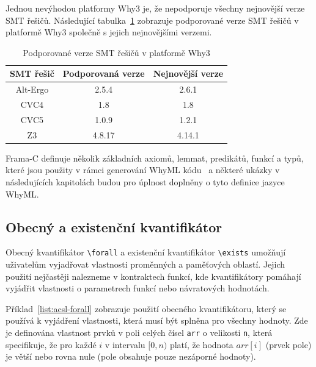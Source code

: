 Jednou nevýhodou platformy Why3 je,
že nepodporuje všechny nejnovější verze SMT řešičů.
Následující tabulka~\ref{tab:why3-smt-verze}
zobrazuje podporované verze SMT řešičů v platformě Why3 společně s jejich nejnovějšími verzemi.

\begin{table}[H]
    \centering
    \begin{tabular}{|c|c|c|}
        \hline
        SMT řešič & Podporovaná verze & Nejnovější verze \\
        \hline
        Alt-Ergo  & 2.5.4             & 2.6.1            \\
        CVC4      & 1.8               & 1.8              \\
        CVC5      & 1.0.9             & 1.2.1            \\
        Z3        & 4.8.17            & 4.14.1           \\
        \hline
    \end{tabular}
    \caption{Podporované verze SMT řešičů v platformě Why3}
    \label{tab:why3-smt-verze}
\end{table}


Frama\mbox{-}C definuje několik základních axiomů, lemmat, predikátů, funkcí a typů,
které jsou použity v rámci generování WhyML kódu~\cite{FCGitWhy} a
některé ukázky v následujících kapitolách budou pro úplnost doplněny o tyto definice jazyce WhyML\@.


\subsection{Obecný a existenční kvantifikátor}
\label{subsec:anotace-kvantifikatory}


Obecný kvantifikátor \texttt{\textbackslash forall} a existenční kvantifikátor \texttt{\textbackslash exists}
umožňují uživatelům vyjadřovat vlastnosti proměnných a paměťových oblastí.
Jejich použití nejčastěji nalezneme v kontraktech funkcí,
kde kvantifikátory pomáhají vyjádřit vlastnosti o parametrech funkcí nebo návratových hodnotách.


Příklad~\ref{list:acsl-forall} zobrazuje použití obecného kvantifikátoru,
který se používá k vyjádření vlastnosti, která musí být splněna pro všechny hodnoty.
Zde je definována vlastnost prvků v poli celých čísel \texttt{arr} o velikosti \texttt{n},
která specifikuje, že pro každé $i$ v intervalu $[0, n)$ platí,
že hodnota $arr[i]$ (prvek pole) je větší nebo rovna nule (pole obsahuje pouze nezáporné hodnoty).

